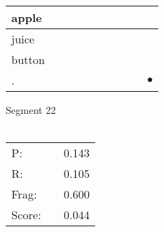\documentclass[landscape]{article}
\newcommand{\ssp}{\hspace{2pt}}
\newcommand{\mex}{\cellcolor{g}$\bullet$}
\begin{document}
\begin{tabular}{|l|p{10pt}|p{10pt}|p{10pt}|p{10pt}|p{10pt}|p{10pt}|p{10pt}|p{10pt}|p{10pt}|}
\hline
\ssp apple \ssp&\hspace{2pt}&\hspace{2pt}&\hspace{2pt}&\hspace{2pt}&\hspace{2pt}&\hspace{2pt}&\hspace{2pt}&\hspace{2pt}&\hspace{2pt}\\
\hline
\ssp juice \ssp&\hspace{2pt}&\hspace{2pt}&\hspace{2pt}&\hspace{2pt}&\hspace{2pt}&\hspace{2pt}&\hspace{2pt}&\hspace{2pt}&\hspace{2pt}\\
\hline
\ssp button \ssp&\hspace{2pt}&\hspace{2pt}&\hspace{2pt}&\hspace{2pt}&\hspace{2pt}&\hspace{2pt}&\hspace{2pt}&\hspace{2pt}&\hspace{2pt}\\
\hline
\ssp \cellcolor{ref8}. \ssp&\hspace{2pt}&\hspace{2pt}&\hspace{2pt}&\hspace{2pt}&\hspace{2pt}&\hspace{2pt}&\hspace{2pt}&\hspace{2pt}&\hspace{2pt}\mex\\
\hline
\end{tabular}

\vspace{6pt}
\noindent Segment 22\\\\
\noindent\begin{tabular}{lm{12pt}r}
\hline
P:&&0.143\\
R:&&0.105\\
Frag:&&0.600\\
Score:&&0.044\\
\end{tabular}
\end{document}
